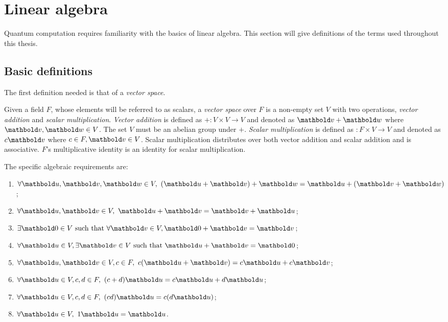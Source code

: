 \section{Linear algebra}\label{sec:linearalgebra}
Quantum computation requires  familiarity with
the basics of linear algebra. This section will give definitions of the
terms used throughout this thesis.
\subsection{Basic definitions}\label{subsec:labasicdefinitions}

The first definition needed is that of a \emph{vector space}.

\begin{definition}
Given a field $F$, whose elements will be referred to as scalars,
 a \emph{vector space} over $F$ is a non-empty set $V$ with
two operations, \emph{vector addition} and \emph{scalar multiplication}.
\emph{Vector addition} is defined
as ${+}:V\times V \to V$ and denoted as $\vc{v}+\vc{w}$
 where
$\vc{v},\vc{w}\in V$. The set $V$ must be an abelian group under $+$.
\emph{Scalar multiplication} is defined as ${}:F\times V \to V$ and denoted as
$c\vc{v}$ where $c\in F, \vc{v} \in V$. Scalar multiplication
distributes over both vector addition and scalar addition and is
 associative. $F$'s multiplicative identity is
an identity for scalar multiplication.
\end{definition}
The specific algebraic requirements are:
\begin{enumerate}
\item{}$\forall \vc{u},\vc{v},\vc{w} \in V,\ (\vc{u} +\vc{v}) +\vc{w} =
 \vc{u}+ (\vc{v}+\vc{w})$;
\item{}$\forall \vc{u},\vc{v} \in V,\ \vc{u} +\vc{v} =
 \vc{v}+ \vc{u}$;
\item{}$\exists  \vc{0} \in V \mathrm{\ such\ that\ } \forall \vc{v} \in V,
 \vc{0} +\vc{v} =  \vc{v}$;
\item{}$\forall \vc{u} \in V, \exists \vc{v} \in V \mathrm{\ such\ that\ }
 \vc{u}+ \vc{v} = \vc{0}$;
\item{}$\forall \vc{u},\vc{v} \in V, c\in F,\
 c(\vc{u}+ \vc{v}) = c\vc{u} + c\vc{v}$;
\item{}$\forall \vc{u} \in V, c,d\in F,\
 (c+d)\vc{u} = c\vc{u} + d\vc{u}$;
\item{}$\forall \vc{u} \in V, c,d\in F,\
 (c d)\vc{u} = c(d\vc{u})$;
\item{}$\forall \vc{u} \in V,\
 1\vc{u} = \vc{u}$.
\end{enumerate}

